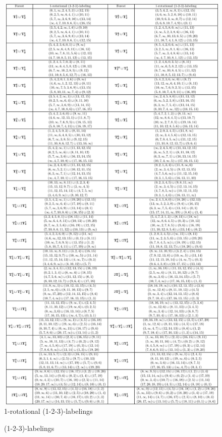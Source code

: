 \documentclass{dmgt}
\begin{document}
\begin{figure}[H]
    \centering
    \includegraphics[scale=0.9]{8(mod 14).pdf}
    \caption{1-rotational (1-2-3)-labelings}
    \label{fig:8mod14}
\end{figure}
\newpage
\begin{figure}

\end{figure}
\newpage
\begin{figure}
\scalebox{1}{}
\caption{(1-2-3)-labelings}
\end{figure}
\end{document}
